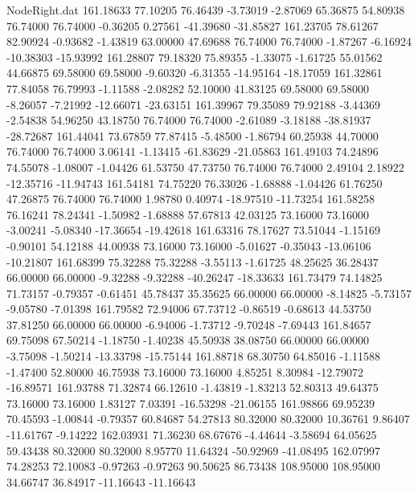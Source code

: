 \begin{filecontents}{NodeRight.dat}
 161.18633   77.10205   76.46439    -3.73019   -2.87069   65.36875   54.80938   76.74000   76.74000   -0.36205    0.27561  -41.39680  -31.85827
 161.23705   78.61267   82.90924    -0.93682   -1.43819   63.00000   47.69688   76.74000   76.74000   -1.87267   -6.16924  -10.38303  -15.93992
 161.28807   79.18320   75.89355    -1.33075   -1.61725   55.01562   44.66875   69.58000   69.58000   -9.60320   -6.31355  -14.95164  -18.17059
 161.32861   77.84058   76.79993    -1.11588   -2.08282   52.10000   41.83125   69.58000   69.58000   -8.26057   -7.21992  -12.66071  -23.63151
 161.39967   79.35089   79.92188    -3.44369   -2.54838   54.96250   43.18750   76.74000   76.74000   -2.61089   -3.18188  -38.81937  -28.72687
 161.44041   73.67859   77.87415    -5.48500   -1.86794   60.25938   44.70000   76.74000   76.74000    3.06141   -1.13415  -61.83629  -21.05863
 161.49103   74.24896   74.55078    -1.08007   -1.04426   61.53750   47.73750   76.74000   76.74000    2.49104    2.18922  -12.35716  -11.94743
 161.54181   74.75220   76.33026    -1.68888   -1.04426   61.76250   47.26875   76.74000   76.74000    1.98780    0.40974  -18.97510  -11.73254
 161.58258   76.16241   78.24341    -1.50982   -1.68888   57.67813   42.03125   73.16000   73.16000   -3.00241   -5.08340  -17.36654  -19.42618
 161.63316   78.17627   73.51044    -1.15169   -0.90101   54.12188   44.00938   73.16000   73.16000   -5.01627   -0.35043  -13.06106  -10.21807
 161.68399   75.32288   75.32288    -3.55113   -1.61725   48.25625   36.28437   66.00000   66.00000   -9.32288   -9.32288  -40.26247  -18.33633
 161.73479   74.14825   71.73157    -0.79357   -0.61451   45.78437   35.35625   66.00000   66.00000   -8.14825   -5.73157   -9.05780   -7.01398
 161.79582   72.94006   67.73712    -0.86519   -0.68613   44.53750   37.81250   66.00000   66.00000   -6.94006   -1.73712   -9.70248   -7.69443
 161.84657   69.75098   67.50214    -1.18750   -1.40238   45.50938   38.08750   66.00000   66.00000   -3.75098   -1.50214  -13.33798  -15.75144
 161.88718   68.30750   64.85016    -1.11588   -1.47400   52.80000   46.75938   73.16000   73.16000    4.85251    8.30984  -12.79072  -16.89571
 161.93788   71.32874   66.12610    -1.43819   -1.83213   52.80313   49.64375   73.16000   73.16000    1.83127    7.03391  -16.53298  -21.06155
 161.98866   69.95239   70.45593    -1.00844   -0.79357   60.84687   54.27813   80.32000   80.32000   10.36761    9.86407  -11.61767   -9.14222
 162.03931   71.36230   68.67676    -4.44644   -3.58694   64.05625   59.43438   80.32000   80.32000    8.95770   11.64324  -50.92969  -41.08495
 162.07997   74.28253   72.10083    -0.97263   -0.97263   90.50625   86.73438  108.95000  108.95000   34.66747   36.84917  -11.16643  -11.16643

\end{filecontents}
